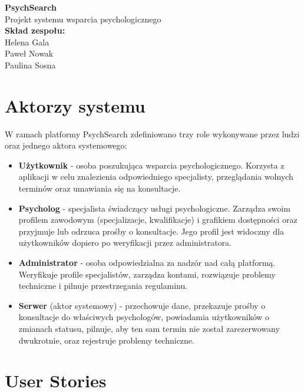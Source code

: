 \documentclass[11pt,a4paper]{article}
\begin{document}
\begin{center}
{\LARGE \textbf{PsychSearch}}\\[0.3cm]
    {\large Projekt systemu wsparcia psychologicznego}\\[0.5cm]
    \textbf{Skład zespołu:}\\
    Helena Gala\\
    Paweł Nowak\\
    Paulina Sosna\\
\end{center}


\section*{Aktorzy systemu}
 
W ramach platformy PsychSearch zdefiniowano
trzy role wykonywane przez ludzi oraz jednego
aktora systemowego:
 
\begin{itemize}
 
\item \textbf{Użytkownik} -
osoba poszukująca wsparcia psychologicznego.
Korzysta z aplikacji w celu znalezienia
odpowiedniego specjalisty, przeglądania
wolnych terminów oraz umawiania się
na konsultacje.
 
\item \textbf{Psycholog} -
specjalista świadczący usługi psychologiczne.
Zarządza swoim profilem zawodowym
(specjalizacje, kwalifikacje) i grafikiem
dostępności oraz przyjmuje lub odrzuca prośby
o konsultacje. Jego profil jest widoczny
dla użytkowników dopiero po weryfikacji
przez administratora.
 
\item \textbf{Administrator} -
osoba odpowiedzialna za nadzór nad całą
platformą. Weryfikuje profile specjalistów,
zarządza kontami, rozwiązuje problemy
techniczne i pilnuje przestrzegania regulaminu.
 
\item \textbf{Serwer} (aktor systemowy) -
przechowuje dane, przekazuje prośby
o konsultacje do właściwych psychologów,
powiadamia użytkowników o zmianach statusu,
pilnuje, aby ten sam termin nie został
zarezerwowany dwukrotnie, oraz rejestruje
problemy techniczne.
 
\end{itemize}
 
\vspace{0.5cm}
 
\section*{User Stories}
 
\end{document}
